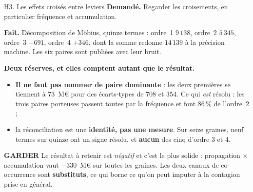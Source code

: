 \documentclass[11pt]{beamer}
\newcommand{\garder}{\textbf{GARDER}}
\newcommand{\srcs}[1]{\vspace{0.8mm}{\tiny\textcolor{gray!50!black}{Sources : #1}}}
\begin{document}
\begin{frame}{H3. Les effets croisés entre leviers}
\scriptsize
\textbf{Demandé.} Regarder les croisements, en particulier fréquence et accumulation.
\vspace{1mm}

\textbf{Fait.} Décomposition de Möbius, quinze termes : ordre~1 $9\,138$, ordre~2 $5\,345$,
ordre~3 $-691$, ordre~4 $+346$, dont la somme redonne $14\,139$ à la précision machine. Les six
paires sont publiées avec leur bruit.
\vspace{1mm}

\textbf{Deux réserves, et elles comptent autant que le résultat.}
\begin{itemize}\itemsep1pt
\item \textbf{Il ne faut pas nommer de paire dominante} : les deux premières se tiennent à
$73$~M\euro{} pour des écarts-types de $708$ et $354$. Ce qui \emph{est} résolu : les trois
paires porteuses passent toutes par la fréquence et font $86\,\%$ de l'ordre~2 ;
\item la réconciliation est une \textbf{identité, pas une mesure}. Sur seize graines, neuf
termes sur quinze ont un signe résolu, et \textbf{aucun} des cinq d'ordre 3 et 4.
\end{itemize}
\begin{block}{\garder}
Le résultat à retenir est \emph{négatif} et c'est le plus solide : propagation $\times$
accumulation vaut $-330$~M\euro{} sur toutes les graines. Les deux canaux de co-occurrence sont
\textbf{substituts}, ce qui borne ce qu'on peut imputer à la contagion prise en général.
\end{block}
\srcs{script~\texttt{68}}
\end{frame}
\end{document}
